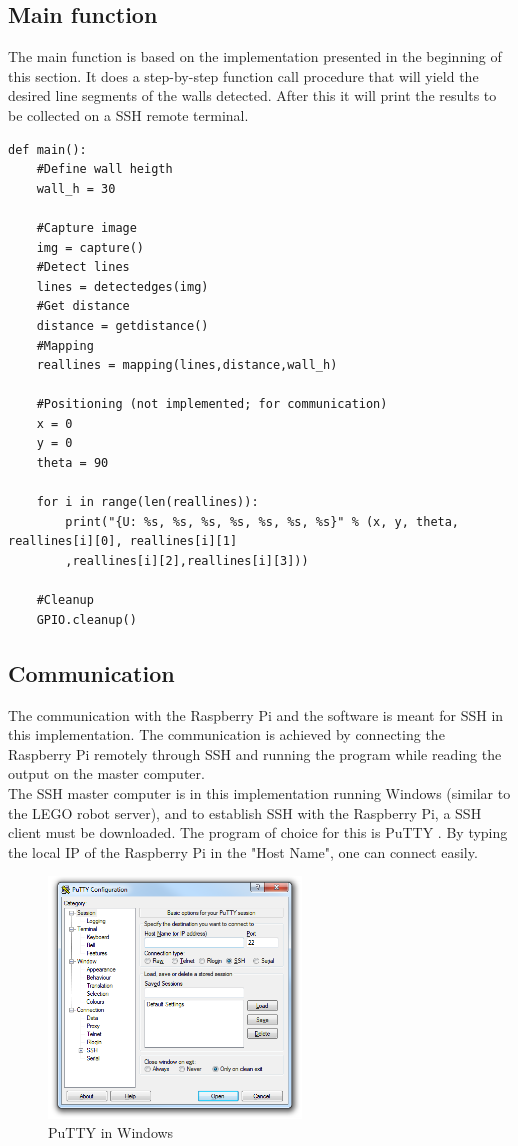 \subsection{Main function}
The main function is based on the implementation presented in the beginning of this section. It does a step-by-step function call procedure that will yield the desired line segments of the walls detected. After this it will print the results to be collected on a SSH remote terminal.
\begin{verbatim}
def main():
    #Define wall heigth
    wall_h = 30
    
    #Capture image
    img = capture()
    #Detect lines
    lines = detectedges(img)
    #Get distance
    distance = getdistance()
    #Mapping 
    reallines = mapping(lines,distance,wall_h)

    #Positioning (not implemented; for communication)
    x = 0
    y = 0
    theta = 90

    for i in range(len(reallines)):
        print("{U: %s, %s, %s, %s, %s, %s, %s}" % (x, y, theta, reallines[i][0], reallines[i][1]
    	,reallines[i][2],reallines[i][3]))
        
    #Cleanup
    GPIO.cleanup()
\end{verbatim}

\subsection{Communication}
The communication with the Raspberry Pi and the software is meant for SSH in this implementation. The communication is achieved by connecting the Raspberry Pi remotely through SSH and running the program while reading the output on the master computer. \\

The SSH master computer is in this implementation running Windows (similar to the LEGO robot server), and to establish SSH with the Raspberry Pi, a SSH client must be downloaded. The program of choice for this is PuTTY \cite{putty}. By typing the local IP of the Raspberry Pi in the "Host Name", one can connect easily. 

\begin{figure}[H]
  \centering
  \includegraphics[width=0.6\textwidth]{fig/putty}
  \caption{PuTTY in Windows}
  \label{fig:putty}
\end{figure}

